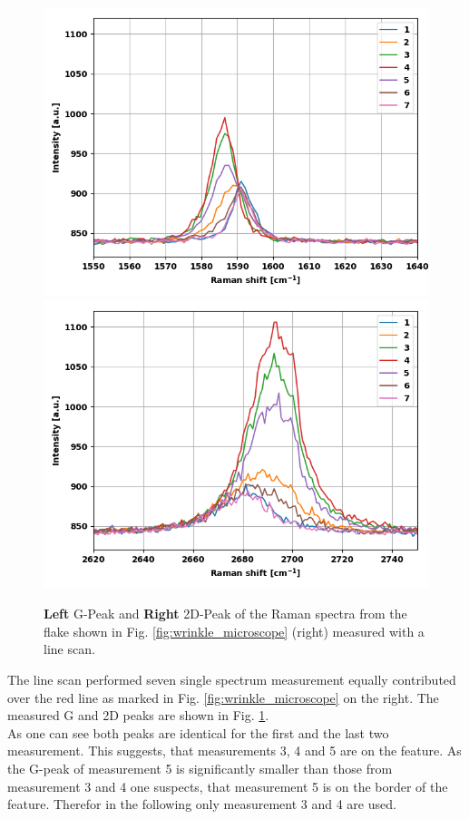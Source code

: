 \documentclass[12pt,a4paper]{article}
\begin{document}
\begin{figure}
\centering
\includegraphics[scale=0.5]{Bilder/Wrinkle/line_scan/line_scan_G_peak.PNG}
\includegraphics[scale=0.5]{Bilder/Wrinkle/line_scan/line_scan_2D_peak.PNG}
\caption{\textbf{Left} G-Peak and \textbf{Right} 2D-Peak of the Raman spectra from the flake shown in Fig. \ref{fig:wrinkle_microscope} (right) measured with a line scan.}
\label{fig:wrinkle_line_Peaks}
\end{figure}

The line scan performed seven single spectrum measurement equally contributed over the red line as marked in Fig. \ref{fig:wrinkle_microscope} on the right. The measured G and 2D peaks are shown in Fig. \ref{fig:wrinkle_line_Peaks}. \\
As one can see both peaks are identical for the first and the last two measurement. This suggests, that measurements 3, 4 and 5 are on the feature. As the G-peak of measurement 5 is significantly smaller than those from measurement 3 and 4 one suspects, that measurement 5 is on the border of the feature. Therefor in the following only measurement 3 and 4 are used.
\end{document}
